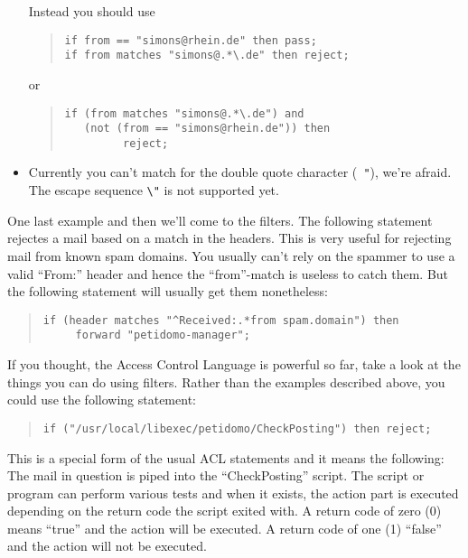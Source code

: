 \documentclass[a4paper,10pt]{scrreprt}
\begin{document}
\begin{itemize}
Instead you should use
\begin{quote}
\begin{verbatim}
if from == "simons@rhein.de" then pass;
if from matches "simons@.*\.de" then reject;
\end{verbatim}
\end{quote}
or
\begin{quote}
\begin{verbatim}
if (from matches "simons@.*\.de") and
   (not (from == "simons@rhein.de")) then
         reject;
\end{verbatim}
\end{quote}

\item Currently you can't match for the double quote character ({\tt
"}), we're afraid. The escape sequence {\tt \verb+\+"} is not
supported yet.

\end{itemize}

One last example and then we'll come to the filters. The following
statement rejectes a mail based on a match in the headers. This is
very useful for rejecting mail from known spam domains. You usually
can't rely on the spammer to use a valid ``From:'' header and hence
the ``from''-match is useless to catch them. But the following
statement will usually get them nonetheless:
\begin{quote}
\begin{verbatim}
if (header matches "^Received:.*from spam.domain") then
     forward "petidomo-manager";
\end{verbatim}
\end{quote}

If you thought, the Access Control Language is powerful so far, take a
look at the things you can do using filters. Rather than the examples
described above, you could use the following statement:
\begin{quote}
\begin{verbatim}
if ("/usr/local/libexec/petidomo/CheckPosting") then reject;
\end{verbatim}
\end{quote}

This is a special form of the usual ACL statements and it means the
following: The mail in question is piped into the ``CheckPosting''
script. The script or program can perform various tests and when it
exists, the action part is executed depending on the return code the
script exited with. A return code of zero (0) means ``true'' and the
action will be executed. A return code of one (1) ``false'' and the
action will not be executed.
\end{document}
